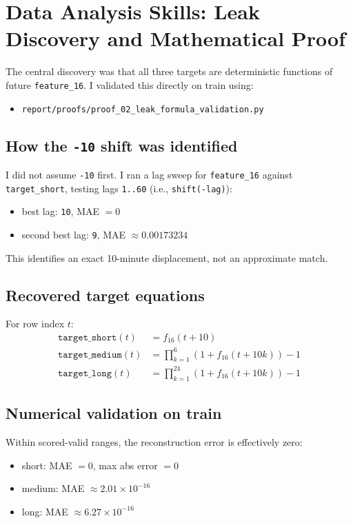 \section{Data Analysis Skills: Leak Discovery and Mathematical Proof}

The central discovery was that all three targets are deterministic functions of future \texttt{feature\_16}. I validated this directly on train using:
\begin{itemize}[leftmargin=1.5em]
  \item \texttt{report/proofs/proof\_02\_leak\_formula\_validation.py}
\end{itemize}

\subsection{How the \texttt{-10} shift was identified}
I did not assume \texttt{-10} first. I ran a lag sweep for \texttt{feature\_16} against \texttt{target\_short}, testing lags \texttt{1..60} (i.e., \texttt{shift(-lag)}):
\begin{itemize}[leftmargin=1.5em]
  \item best lag: \texttt{10}, MAE $=0$
  \item second best lag: \texttt{9}, MAE $\approx 0.00173234$
\end{itemize}
This identifies an exact 10-minute displacement, not an approximate match.

\subsection{Recovered target equations}
For row index $t$:
\begin{align}
\texttt{target\_short}(t) &= f_{16}(t+10) \\
\texttt{target\_medium}(t) &= \prod_{k=1}^{6} (1 + f_{16}(t+10k)) - 1 \\
\texttt{target\_long}(t) &= \prod_{k=1}^{24} (1 + f_{16}(t+10k)) - 1
\end{align}

\subsection{Numerical validation on train}
Within scored-valid ranges, the reconstruction error is effectively zero:
\begin{itemize}[leftmargin=1.5em]
  \item short: MAE $=0$, max abs error $=0$
  \item medium: MAE $\approx 2.01\times 10^{-16}$
  \item long: MAE $\approx 6.27\times 10^{-16}$
\end{itemize}


